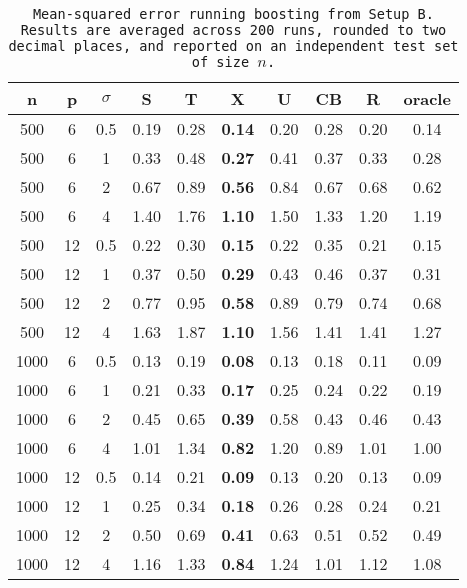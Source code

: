 \begin{table}[ht]
\centering
\begin{tabular}{cccccccccc}
  \hline
n & p & $\sigma$ & S & T & X & U & CB & R & oracle \\ 
  \hline
500 & 6 & 0.5 & 0.19 & 0.28 & \bf 0.14 & 0.20 & 0.28 & 0.20 & 0.14 \\ 
  500 & 6 & 1 & 0.33 & 0.48 & \bf 0.27 & 0.41 & 0.37 & 0.33 & 0.28 \\ 
  500 & 6 & 2 & 0.67 & 0.89 & \bf 0.56 & 0.84 & 0.67 & 0.68 & 0.62 \\ 
  500 & 6 & 4 & 1.40 & 1.76 & \bf 1.10 & 1.50 & 1.33 & 1.20 & 1.19 \\ 
  500 & 12 & 0.5 & 0.22 & 0.30 & \bf 0.15 & 0.22 & 0.35 & 0.21 & 0.15 \\ 
  500 & 12 & 1 & 0.37 & 0.50 & \bf 0.29 & 0.43 & 0.46 & 0.37 & 0.31 \\ 
  500 & 12 & 2 & 0.77 & 0.95 & \bf 0.58 & 0.89 & 0.79 & 0.74 & 0.68 \\ 
  500 & 12 & 4 & 1.63 & 1.87 & \bf 1.10 & 1.56 & 1.41 & 1.41 & 1.27 \\ 
  1000 & 6 & 0.5 & 0.13 & 0.19 & \bf 0.08 & 0.13 & 0.18 & 0.11 & 0.09 \\ 
  1000 & 6 & 1 & 0.21 & 0.33 & \bf 0.17 & 0.25 & 0.24 & 0.22 & 0.19 \\ 
  1000 & 6 & 2 & 0.45 & 0.65 & \bf 0.39 & 0.58 & 0.43 & 0.46 & 0.43 \\ 
  1000 & 6 & 4 & 1.01 & 1.34 & \bf 0.82 & 1.20 & 0.89 & 1.01 & 1.00 \\ 
  1000 & 12 & 0.5 & 0.14 & 0.21 & \bf 0.09 & 0.13 & 0.20 & 0.13 & 0.09 \\ 
  1000 & 12 & 1 & 0.25 & 0.34 & \bf 0.18 & 0.26 & 0.28 & 0.24 & 0.21 \\ 
  1000 & 12 & 2 & 0.50 & 0.69 & \bf 0.41 & 0.63 & 0.51 & 0.52 & 0.49 \\ 
  1000 & 12 & 4 & 1.16 & 1.33 & \bf 0.84 & 1.24 & 1.01 & 1.12 & 1.08 \\ 
   \hline
\end{tabular}
\caption{\tt Mean-squared error running \texttt{boosting} from Setup B. Results are averaged across 200 runs, rounded to two decimal places, and reported on an independent test set of size $n$.} 
\label{table:setup2}
\end{table}
